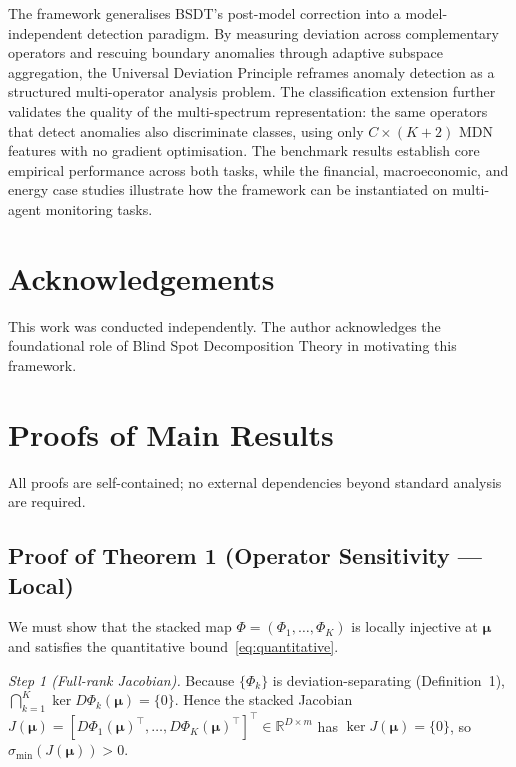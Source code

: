 \documentclass[journal]{IEEEtran}
\newcommand{\R}{\mathbb{R}}
\begin{document}
The framework generalises BSDT's post-model correction into a model-independent detection paradigm.  By measuring deviation across complementary operators and rescuing boundary anomalies through adaptive subspace aggregation, the Universal Deviation Principle reframes anomaly detection as a structured multi-operator analysis problem.  The classification extension further validates the quality of the multi-spectrum representation: the same operators that detect anomalies also discriminate classes, using only $C{\times}(K{+}2)$ MDN features with no gradient optimisation.  The benchmark results establish core empirical performance across both tasks, while the financial, macroeconomic, and energy case studies illustrate how the framework can be instantiated on multi-agent monitoring tasks.

\section*{Acknowledgements}
This work was conducted independently.  The author acknowledges the foundational role of Blind Spot Decomposition Theory in motivating this framework.

\appendix
\section{Proofs of Main Results}
\label{app:proofs}

All proofs are self-contained; no external dependencies beyond standard analysis are required.

\subsection{Proof of Theorem 1 (Operator Sensitivity --- Local)}

We must show that the stacked map $\Phi = (\Phi_1,\ldots,\Phi_K)$ is locally injective at $\boldsymbol{\mu}$ and satisfies the quantitative bound~\eqref{eq:quantitative}.

\textit{Step 1 (Full-rank Jacobian).}
Because $\{\Phi_k\}$ is deviation-separating (Definition~1), $\bigcap_{k=1}^{K}\ker D\Phi_k(\boldsymbol{\mu}) = \{0\}$.
Hence the stacked Jacobian $J(\boldsymbol{\mu}) = [D\Phi_1(\boldsymbol{\mu})^\top,\ldots,D\Phi_K(\boldsymbol{\mu})^\top]^\top \in \R^{D\times m}$ has $\ker J(\boldsymbol{\mu})=\{0\}$, so $\sigma_{\min}(J(\boldsymbol{\mu}))>0$.
\end{document}
